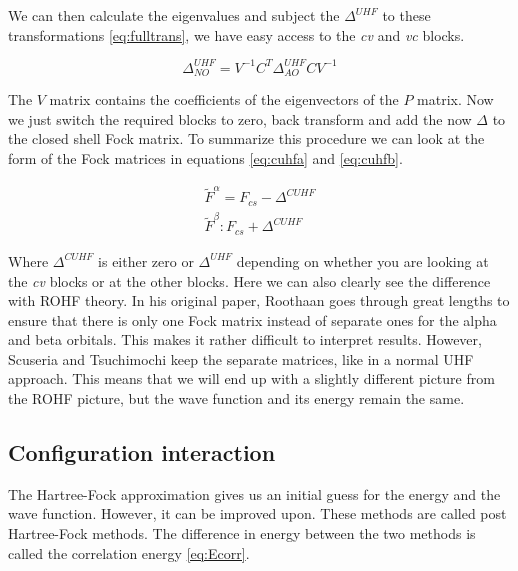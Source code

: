 \documentclass[twoside,twocolumn,9pt]{article}
\begin{document}
We can then calculate the eigenvalues and subject the $\Delta^{UHF}$ to these transformations \eqref{eq:fulltrans}, we have easy access to the \textit{cv} and \textit{vc} blocks.

\begin{equation}\label{eq:fulltrans}
  \Delta_{NO}^{UHF} = V^{-1} C^T \Delta^{UHF}_{AO} C V^{-1}
\end{equation}

The $V$ matrix contains the coefficients of the eigenvectors of the $P$ matrix. Now we just switch the required blocks to zero, back transform and add the now $\Delta$ to the closed
shell Fock matrix. To summarize this procedure we can look at the form of the Fock matrices in equations \eqref{eq:cuhfa} and \eqref{eq:cuhfb}.

\begin{subequations}
  \begin{align}
    \label{eq:cuhfa}
    \tilde{F}^\alpha = F_{cs} - \Delta^{CUHF} \\
    \label{eq:cuhfb}
    \tilde{F}^\beta : F_{cs} + \Delta^{CUHF}
  \end{align}
\end{subequations}

Where $\Delta^{CUHF}$ is either zero or $\Delta^{UHF}$ depending on whether you are looking at the \textit{cv} blocks or at the other blocks. Here we can also clearly see the 
difference with ROHF theory. In his original paper, Roothaan goes through great lengths to ensure that there is only one Fock matrix instead of separate ones for the alpha and 
beta orbitals\cite{Roothaan1960}. This makes it rather difficult to interpret results\cite{Scuseria2010}. However, Scuseria and Tsuchimochi keep the separate matrices, like in a 
normal UHF approach. This means that we will end up with a slightly different picture from the ROHF picture, but the wave function and its energy remain the same\cite{Scuseria2010}. 

\subsection{Configuration interaction}
\label{subsec:cistheory}

The Hartree-Fock approximation gives us an initial guess for the energy and the wave function. However, it can be improved upon. These methods are called post Hartree-Fock methods.
The difference in energy between the two methods is called the correlation energy \eqref{eq:Ecorr}.
\end{document}
